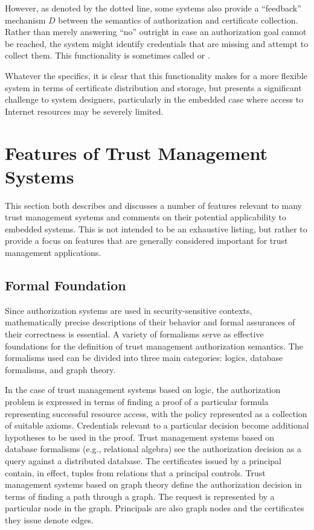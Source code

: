 However, as denoted by the dotted line, some systems also provide a ``feedback'' mechanism $D$
between the semantics of authorization and certificate collection. Rather than merely answering
``no'' outright in case an authorization goal cannot be reached, the system might identify
credentials that are missing and attempt to collect them. This functionality is sometimes called
 \cite{Li:DCDTM} or  \cite{Gunter:PDCR}.

Whatever the specifics, it is clear that this functionality makes for a more flexible system in
terms of certificate distribution and storage, but presents a significant challenge to system
designers, particularly in the embedded case where access to Internet resources may be severely
limited.

\section{Features of Trust Management Systems}
\label{section-features}

This section both describes and discusses a number of features relevant to many trust management
systems and comments on their potential applicability to embedded systems. This is not intended
to be an exhaustive listing, but rather to provide a focus on features that are generally
considered important for trust management applications.

\subsection{Formal Foundation}

Since authorization systems are used in security-sensitive contexts, mathematically precise
descriptions of their behavior and formal assurances of their correctness is essential. A
variety of formalisms serve as effective foundations for the definition of trust management
authorization semantics. The formalisms used can be divided into three main categories: logics,
database formalisms, and graph theory.

In the case of trust management systems based on logic, the authorization problem is expressed
in terms of finding a proof of a particular formula representing successful resource access,
with the policy represented as a collection of suitable axioms. Credentials relevant to a
particular decision become additional hypotheses to be used in the proof. Trust management
systems based on database formalisms (e.g., relational algebra) see the authorization decision
as a query against a distributed database. The certificates issued by a principal contain, in
effect, tuples from relations that a principal controls. Trust management systems based on graph
theory define the authorization decision in terms of finding a path through a graph. The request
is represented by a particular node in the graph. Principals are also graph nodes and the
certificates they issue denote edges.

